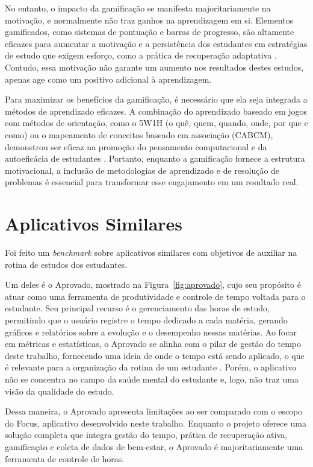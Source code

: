 No entanto, o impacto da gamificação se manifesta majoritariamente na motivação, e normalmente não traz ganhos na aprendizagem em si.
Elementos gamificados, como sistemas de pontuação e barras de progresso, são altamente eficazes para aumentar a motivação e a persistência dos estudantes em estratégias de estudo que exigem esforço, como a prática de recuperação adaptativa \cite{vandenbroek_2026}.
Contudo, essa motivação não garante um aumento nos resultados destes estudos, apenas age como um positivo adicional à aprendizagem.

Para maximizar os benefícios da gamificação, é necessário que ela seja integrada a métodos de aprendizado eficazes.
A combinação do aprendizado baseado em jogos com métodos de orientação, como o 5W1H (o quê, quem, quando, onde, por que e como) ou o mapeamento de conceitos baseado em associação (CABCM), demonstrou ser eficaz na promoção do pensamento computacional e da autoeficácia de estudantes \cite{hsu_2026}.
Portanto, enquanto a gamificação fornece a estrutura motivacional, a inclusão de metodologias de aprendizado e de resolução de problemas é essencial para transformar esse engajamento em um resultado real.

\clearpage
\raggedbottom
\section{Aplicativos Similares}

Foi feito um \textit{benchmark} sobre aplicativos similares com objetivos de auxiliar na rotina de estudos dos estudantes.

Um deles é o Aprovado, mostrado na Figura~\ref{fig:aprovado}, cujo seu propósito é atuar como uma ferramenta de produtividade e controle de tempo voltada para o estudante.
Seu principal recurso é o gerenciamento das horas de estudo, permitindo que o usuário registre o tempo dedicado a cada matéria, gerando gráficos e relatórios sobre a evolução e o desempenho nessas matérias.
Ao focar em métricas e estatísticas, o Aprovado se alinha com o pilar de gestão do tempo deste trabalho, fornecendo uma ideia de onde o tempo está sendo aplicado, o que é relevante para a organização da rotina de um estudante \cite{aprovado_2026}. Porém, o aplicativo não se concentra no campo da saúde mental do estudante e, logo, não traz uma visão da qualidade do estudo.

Dessa maneira, o Aprovado apresenta limitações ao ser comparado com o escopo do Focus, aplicativo desenvolvido neste trabalho.
Enquanto o projeto oferece uma solução completa que integra gestão do tempo, prática de recuperação ativa, gamificação e coleta de dados de bem-estar, o Aprovado é majoritariamente uma ferramenta de controle de horas.

